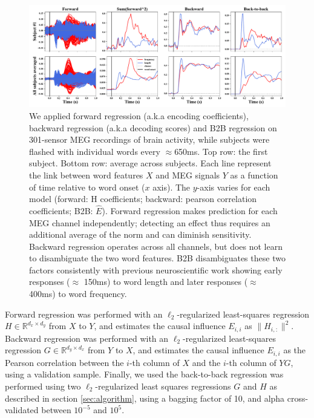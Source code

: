 \begin{figure}[t!]
  \centering
  \includegraphics[width=\textwidth, trim=0cm 0cm 0cm 0cm, clip=True]{figures/meg_twocurves.pdf}
  \caption{We applied forward regression (a.k.a encoding coefficients), backward regression (a.k.a decoding scores) and B2B regression on 301-sensor MEG recordings of brain activity, while subjects were flashed with individual words every $\approx$650ms. Top row: the first subject. Bottom row: average across subjects. Each line represent the link between word features $X$ and MEG signals $Y$
  as a function of time relative to word onset ($x$ axis). The $y$-axis varies for each model (forward: H coefficients; backward: pearson correlation coefficients; B2B: $\hat E$). Forward regression makes prediction for each MEG channel independently; detecting an effect thus requires an additional average of the norm and can diminish sensitivity. Backward regression operates across all channels, but does not learn to disambiguate the two word features. B2B disambiguates these two factors consistently with previous neuroscientific work \cite{kutas2011thirty}\citep{pegado2014timing}
  showing early responses ($\approx$ 150ms) to word length and later responses
  ($\approx$ 400ms) to word frequency.}
  \label{fig:meg_twocurves}
\end{figure}

Forward regression was performed with an $\ell_2$-regularized least-squares regression $H \in \mathbb{R}^{d_x \times d_y}$ from $X$ to $Y$, and estimates the causal influence $E_{i,i}$ as $\| H_{i, :} \|^2$.
%
Backward regression was performed with an $\ell_2$-regularized least-squares regression $G \in \mathbb{R}^{d_y \times d_x}$ from $Y$ to $X$, and estimates the causal influence $E_{i, i}$ as the Pearson correlation between the $i$-th column of $X$ and the $i$-th column of $YG$, using a validation sample.
%
Finally, we used the back-to-back regression was performed using two $\ell_2$-regularized
least squares regressions $G$ and $H$ as described in section \ref{sec:algorithm}, using a bagging factor of 10, and alpha cross-validated between $10^{-5}$ and $10^{5}$.

